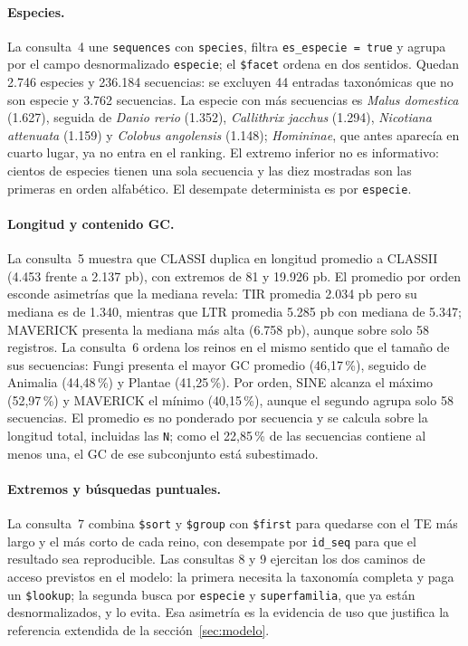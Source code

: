 \documentclass[journal]{IEEEtran}
\begin{document}
\paragraph*{Especies.}
La consulta~4 une \texttt{sequences} con \texttt{species}, filtra
\texttt{es\_especie = true} y agrupa por el campo desnormalizado \texttt{especie}; el
\texttt{\$facet} ordena en dos sentidos. Quedan 2.746 especies y 236.184 secuencias: se
excluyen 44 entradas taxonómicas que no son especie y 3.762 secuencias. La especie con más
secuencias es \textit{Malus domestica} (1.627), seguida de \textit{Danio rerio} (1.352),
\textit{Callithrix jacchus} (1.294), \textit{Nicotiana attenuata} (1.159) y
\textit{Colobus angolensis} (1.148); \textit{Homininae}, que antes aparecía en cuarto
lugar, ya no entra en el ranking. El extremo inferior no es informativo: cientos de
especies tienen una sola secuencia y las diez mostradas son las primeras en orden
alfabético. El desempate determinista es por \texttt{especie}.

\paragraph*{Longitud y contenido GC.}
La consulta~5 muestra que CLASSI duplica en longitud promedio a CLASSII (4.453 frente a
2.137 pb), con extremos de 81 y 19.926 pb. El promedio por orden esconde asimetrías que la
mediana revela: TIR promedia 2.034 pb pero su mediana es de 1.340, mientras que LTR
promedia 5.285 pb con mediana de 5.347; MAVERICK presenta la mediana más alta (6.758 pb),
aunque sobre solo 58 registros. La consulta~6 ordena los reinos en el mismo sentido que el
tamaño de sus secuencias: Fungi presenta el mayor GC promedio (46,17\,\%), seguido de
Animalia (44,48\,\%) y Plantae (41,25\,\%). Por orden, SINE alcanza el máximo (52,97\,\%) y
MAVERICK el mínimo (40,15\,\%), aunque el segundo agrupa solo 58 secuencias. El promedio es
no ponderado por secuencia y se calcula sobre la longitud total, incluidas las \texttt{N};
como el 22,85\,\% de las secuencias contiene al menos una, el GC de ese subconjunto está
subestimado.

\paragraph*{Extremos y búsquedas puntuales.}
La consulta~7 combina \texttt{\$sort} y \texttt{\$group} con \texttt{\$first} para quedarse
con el TE más largo y el más corto de cada reino, con desempate por \texttt{id\_seq} para que
el resultado sea reproducible. Las consultas 8 y 9 ejercitan los dos caminos de acceso
previstos en el modelo: la primera necesita la taxonomía completa y paga un
\texttt{\$lookup}; la segunda busca por \texttt{especie} y \texttt{superfamilia}, que ya
están desnormalizados, y lo evita. Esa asimetría es la evidencia de uso que justifica la
referencia extendida de la sección~\ref{sec:modelo}.
\end{document}
